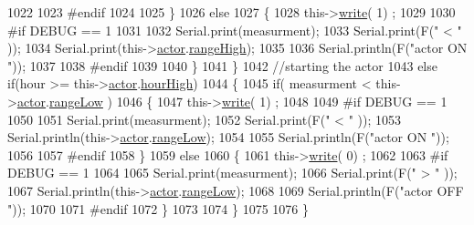 \begin{DoxyCode}
1022 
1023 \textcolor{preprocessor}{            #endif  }
1024 
1025             \}
1026             \textcolor{keywordflow}{else} 
1027             \{
1028                 this->\hyperlink{class_cool_board_actor_a958786ff01ea1056ee72c72d439f86da}{write}( 1) ;
1029 
1030 \textcolor{preprocessor}{            #if DEBUG == 1 }
1031 
1032                 Serial.print(measurment);
1033                 Serial.print(F(\textcolor{stringliteral}{" < "} ));
1034                 Serial.print(this->\hyperlink{class_cool_board_actor_a8f190db9f7a39fddbcef7f152da970e9}{actor}.\hyperlink{struct_cool_board_actor_1_1state_a6e5cd6c5cd44e2decfd8d4df1853f8e3}{rangeHigh});
1035 
1036                 Serial.println(F(\textcolor{stringliteral}{"actor ON "}));
1037 
1038 \textcolor{preprocessor}{            #endif  }
1039                 
1040             \}
1041     \}
1042     \textcolor{comment}{//starting the actor}
1043     \textcolor{keywordflow}{else} \textcolor{keywordflow}{if}(hour >= this->\hyperlink{class_cool_board_actor_a8f190db9f7a39fddbcef7f152da970e9}{actor}.\hyperlink{struct_cool_board_actor_1_1state_acd1af3ac2382258a5b05497d814adc01}{hourHigh})
1044     \{
1045             \textcolor{keywordflow}{if}( measurment < this->\hyperlink{class_cool_board_actor_a8f190db9f7a39fddbcef7f152da970e9}{actor}.\hyperlink{struct_cool_board_actor_1_1state_a43f891c9fb3bb63575c27cec860de55a}{rangeLow} )
1046             \{
1047                 this->\hyperlink{class_cool_board_actor_a958786ff01ea1056ee72c72d439f86da}{write}( 1) ;
1048 
1049 \textcolor{preprocessor}{            #if DEBUG == 1 }
1050 
1051                 Serial.print(measurment);
1052                 Serial.print(F(\textcolor{stringliteral}{" < "} ));
1053                 Serial.println(this->\hyperlink{class_cool_board_actor_a8f190db9f7a39fddbcef7f152da970e9}{actor}.\hyperlink{struct_cool_board_actor_1_1state_a43f891c9fb3bb63575c27cec860de55a}{rangeLow});
1054 
1055                 Serial.println(F(\textcolor{stringliteral}{"actor ON "}));
1056 
1057 \textcolor{preprocessor}{            #endif  }
1058             \}
1059             \textcolor{keywordflow}{else} 
1060             \{
1061                 this->\hyperlink{class_cool_board_actor_a958786ff01ea1056ee72c72d439f86da}{write}( 0) ;
1062 
1063 \textcolor{preprocessor}{            #if DEBUG == 1 }
1064 
1065                 Serial.print(measurment);
1066                 Serial.print(F(\textcolor{stringliteral}{" > "} ));
1067                 Serial.println(this->\hyperlink{class_cool_board_actor_a8f190db9f7a39fddbcef7f152da970e9}{actor}.\hyperlink{struct_cool_board_actor_1_1state_a43f891c9fb3bb63575c27cec860de55a}{rangeLow});
1068 
1069                 Serial.println(F(\textcolor{stringliteral}{"actor OFF "}));
1070 
1071 \textcolor{preprocessor}{            #endif                  }
1072             \}
1073 
1074     \}
1075 
1076 \}
\end{DoxyCode}

